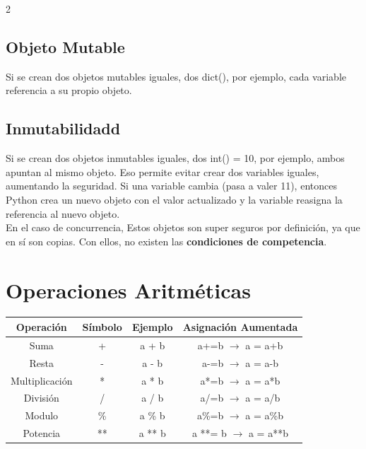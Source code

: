 \documentclass[a4paper,10pt]{article}
\begin{document}
\begin{multicols}{2}
    \subsection*{Objeto Mutable}

    Si se crean dos objetos mutables iguales, dos dict(), por ejemplo, cada variable referencia a su propio objeto.
    \columnbreak

    \subsection*{Inmutabilidadd}

    Si se crean dos objetos inmutables iguales, dos int() = 10, por ejemplo, ambos apuntan al mismo objeto. 
    Eso permite evitar crear dos variables iguales, aumentando la seguridad.
    Si una variable cambia (pasa a valer 11), entonces Python crea un nuevo objeto con el valor actualizado y la variable reasigna la referencia
    al nuevo objeto. \\
    En el caso de concurrencia, Estos objetos son super seguros por definición, ya que en sí son copias. Con ellos, no existen las \textbf{condiciones
    de competencia}.
\end{multicols}

\section*{Operaciones Aritméticas}
\begin{center}
    \begin{tabular}{| c | c | c | c |}
        \hline
        Operación & Símbolo & Ejemplo & Asignación Aumentada \\
        \hline\hline
        Suma & + & a + b & a+=b $\rightarrow$  a = a+b\\
        \hline
        Resta & - & a - b & a-=b $\rightarrow$ a = a-b\\
        \hline
        Multiplicación & * &  a * b & a*=b $\rightarrow$ a = a*b\\
        \hline
        División & / & a / b & a/=b $\rightarrow$ a = a/b\\
        \hline
        Modulo & \% & a \% b & a\%=b $\rightarrow$ a = a\%b\\
        \hline
        Potencia & ** & a ** b &  a **= b $\rightarrow$ a = a**b \\
        \hline
    \end{tabular}
\end{center}
\end{document}
